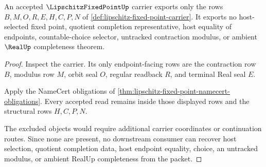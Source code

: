 \begin{theorem}
\label{thm:lipschitz-fixed-point-nonescape}
An accepted $\LipschitzFixedPointUp$ carrier exports only the rows $B,M,O,R,E,H,C,P,N$ of \autoref{def:lipschitz-fixed-point-carrier}. It exports no host-selected fixed point, quotient completion representative, host equality of endpoints, countable-choice selector, untracked contraction modulus, or ambient $\RealUp$ completeness theorem.
\end{theorem}
\begin{proof}
Inspect the carrier. Its only endpoint-facing rows are the contraction row $B$, modulus row $M$, orbit seal $O$, regular readback $R$, and terminal Real seal $E$.

Apply the NameCert obligations of \autoref{thm:lipschitz-fixed-point-namecert-obligations}. Every accepted read remains inside those displayed rows and the structural rows $H,C,P,N$.

The excluded objects would require additional carrier coordinates or continuation routes. Since none are present, no downstream consumer can recover host selection, quotient completion data, host endpoint equality, choice, an untracked modulus, or ambient RealUp completeness from the packet.
\end{proof}




